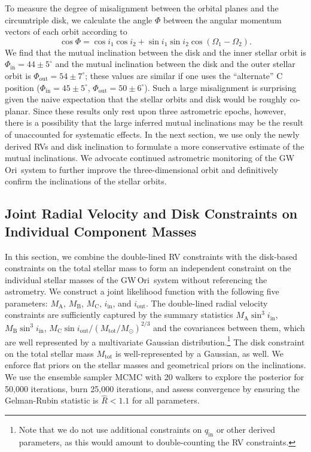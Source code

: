 \documentclass[twocolumn]{aastex61}
\newcommand{\obj}{GW\,Ori}
\begin{document}
To measure the degree of misalignment between the orbital planes and the circumtriple disk, we calculate the angle $\Phi$ between the angular momentum vectors of each orbit according to \citet{fekel81}
\begin{equation}
  \cos \Phi = \cos i_1 \cos i_2 + \sin i_1 \sin i_2 \cos(\Omega_1 - \Omega_2).
\end{equation}
We find that the mutual inclination between the disk and the inner stellar orbit is $\Phi_\mathrm{in} = 44\pm5^\circ$ and the mutual inclination between the disk and the outer stellar orbit is $\Phi_\mathrm{out} = 54\pm 7^\circ$; these values are similar if one uses the ``alternate'' C position ($\Phi_\mathrm{in} = 45 \pm 5^\circ$, $\Phi_\mathrm{out} = 50 \pm 6^\circ$). Such a large misalignment is surprising given the naive expectation that the stellar orbits and disk would be roughly co-planar.  Since these results only rest upon three astrometric epochs, however, there is a possibility that the large inferred mutual inclinations may be the result of unaccounted for systematic effects. In the next section, we use only the newly derived RVs and disk inclination to formulate a more conservative estimate of the mutual inclinations. We advocate continued astrometric monitoring of the \obj\ system to further improve the three-dimensional orbit and definitively confirm the inclinations of the stellar orbits.

\subsection{Joint Radial Velocity and Disk Constraints on Individual Component Masses}
\label{sec:joint}
In this section, we combine the double-lined RV constraints with the disk-based constraints on the total stellar mass to form an independent constraint on the individual stellar masses of the \obj\ system without referencing the \citet{berger11} astrometry. We construct a joint likelihood function with the following five parameters: $M_\mathrm{A}$, $M_\mathrm{B}$, $M_\mathrm{C}$, $i_\mathrm{in}$, and $i_\mathrm{out}$.
The double-lined radial velocity constraints are sufficiently captured by the summary statistics $M_\mathrm{A} \sin^3 i_\mathrm{in}$, $M_\mathrm{B} \sin^3 i_\mathrm{in}$, $M_\mathrm{C} \sin i_\mathrm{out} / (M_\mathrm{tot} / M_\odot)^{2/3}$ and the covariances between them, which are well represented by a multivariate Gaussian distribution.\footnote{Note that we do not use additional constraints on $q_\mathrm{in}$ or other derived parameters, as this would amount to double-counting the RV constraints.} The disk constraint on the total stellar mass $M_\mathrm{tot}$ is well-represented by a Gaussian, as well.
We enforce flat priors on the stellar masses and geometrical priors on the inclinations. We use the ensemble sampler MCMC \citep{goodman10,foreman-mackey13} with 20 walkers to explore the posterior for 50,000 iterations, burn 25,000 iterations, and assess convergence by ensuring the Gelman-Rubin statistic \citep{gelman14} is $\hat{R} < 1.1$ for all parameters.
\end{document}
